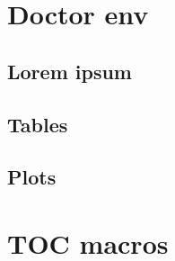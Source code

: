 \documentclass{doctor}
\begin{document}


%
{ %
	\makeatletter
		\@twosidetrue
		\@openrighttrue
	\makeatother
	
	\ifodd\thepage\relax\else\blankpage\fi
	
	\tableofcontents
	\newpage
	\ifodd\thepage\relax\else\blankpage\fi
	
	
	\setcounter{page}{1}
}

\chapter{Doctor env}


\begin{main-points}
	\item \lipsum[1]
	\item \lipsum[2]
	\item \lipsum[3]
\end{main-points}

\section{Lorem ipsum}

\lipsum[1-3]

\newpage

\section{Tables}




\section{Plots}



\newpage



\newpage

\chapter{TOC macros}
\end{document}
